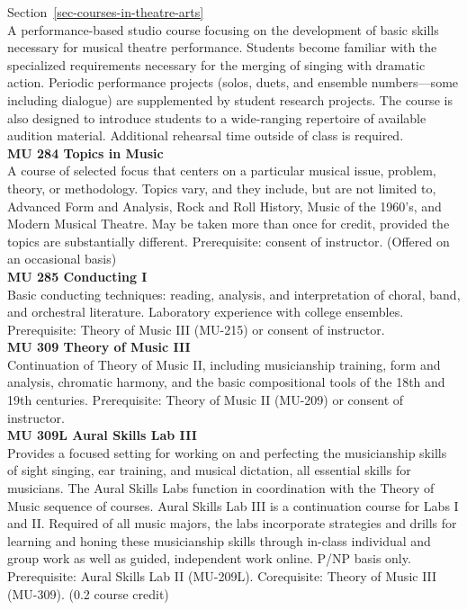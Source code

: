 \documentclass[
  letterpaper,
]{scrbook}
\begin{document}
Section~\ref{sec-courses-in-theatre-arts}\\
A performance-based studio course focusing on the development of basic
skills necessary for musical theatre performance. Students become
familiar with the specialized requirements necessary for the merging of
singing with dramatic action. Periodic performance projects (solos,
duets, and ensemble numbers---some including dialogue) are supplemented
by student research projects. The course is also designed to introduce
students to a wide-ranging repertoire of available audition material.
Additional rehearsal time outside of class is required.\\
\textbf{MU 284 Topics in Music}\\
A course of selected focus that centers on a particular musical issue,
problem, theory, or methodology. Topics vary, and they include, but are
not limited to, Advanced Form and Analysis, Rock and Roll History, Music
of the 1960's, and Modern Musical Theatre. May be taken more than once
for credit, provided the topics are substantially different.
Prerequisite: consent of instructor. (Offered on an occasional basis)\\
\textbf{MU 285 Conducting I}\\
Basic conducting techniques: reading, analysis, and interpretation of
choral, band, and orchestral literature. Laboratory experience with
college ensembles. Prerequisite: Theory of Music III (MU-215) or consent
of instructor.\\
\textbf{MU 309 Theory of Music III}\\
Continuation of Theory of Music II, including musicianship training,
form and analysis, chromatic harmony, and the basic compositional tools
of the 18th and 19th centuries. Prerequisite: Theory of Music II
(MU-209) or consent of instructor.\\
\textbf{MU 309L Aural Skills Lab III}\\
Provides a focused setting for working on and perfecting the
musicianship skills of sight singing, ear training, and musical
dictation, all essential skills for musicians. The Aural Skills Labs
function in coordination with the Theory of Music sequence of courses.
Aural Skills Lab III is a continuation course for Labs I and II.
Required of all music majors, the labs incorporate strategies and drills
for learning and honing these musicianship skills through in-class
individual and group work as well as guided, independent work online.
P/NP basis only. Prerequisite: Aural Skills Lab II (MU-209L).
Corequisite: Theory of Music III (MU-309). (0.2 course credit)\\
\end{document}
